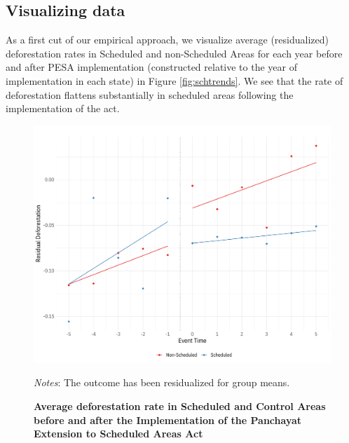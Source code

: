 \documentclass[12pt,reqno]{article}
\begin{document}
\subsection{Visualizing data}
As a first cut of our empirical approach, we visualize average (residualized) deforestation rates in Scheduled and non-Scheduled Areas for each year before and after PESA implementation (constructed relative to the year of implementation in each state) in Figure \ref{fig:schtrends}. We see that the rate of deforestation flattens substantially in scheduled areas following the implementation of the act.



\begin{figure}[htbp!]
\begin{center}
\begin{minipage}{1 \linewidth}
 \caption{\textbf{Average deforestation rate in Scheduled and Control Areas before and after the Implementation of the Panchayat Extension to Scheduled Areas Act}}	
\centerline{\includegraphics[width=5 in,angle=0]{Output/levels_time_trends.pdf}}
\smallskip
\scriptsize
\emph{Notes}: The outcome has been residualized for group means.
\end{minipage}
\end{center}
\end{figure}
\end{document}

